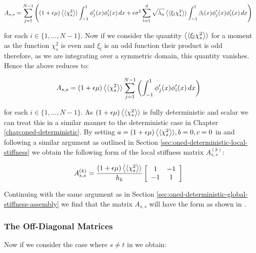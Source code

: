 \begin{equation}
    A_{s,s} = \sum_{j=1}^{N-1}\left((1 + \epsilon\mu)\left\langle\langle\chi_s^2\right\rangle\rangle
        \int_{-1}^1 \phi_j'(x)\phi_i'(x)\, dx
       + \epsilon\sigma^2\sum_{l=1}^d\sqrt{\lambda_n}\left\langle\langle\xi_l\chi_s^2\right\rangle\rangle
       \int_{-1}^1 \beta_l(x)\phi_j'(x)\phi_i'(x) \, dx\right)
\end{equation}

for each $i \in \{1,\ldots,N-1\}$. Now if we consider the quantity
$\left\langle\langle\xi_l\chi_s^2\right\rangle\rangle$ for a moment as the function $\chi_s^2$ is even and
$\xi_l$ is an odd function their product is odd therefore, as we are integrating
over a symmetric domain, this quantity vanishes. Hence the above reduces to:

\begin{equation}
    A_{s,s} = (1 + \epsilon\mu)\left\langle\langle\chi_s^2\right\rangle\rangle\sum_{j=1}^{N - 1}\left(\int_{-1}^1
                \phi_j'(x)\phi_i'(x)\, dx\right)
\end{equation}

for each $i \in \{1,\ldots,N-1\}$. As $(1 + \epsilon\mu)\left\langle\langle\chi_s^2\right\rangle\rangle$ is
fully deterministic and scalar we can treat this in a similar manner to the
deterministic case in  Chapter \ref{chap:oned-deterministic}. By setting $a =
(1 +\epsilon\mu)\left\langle\langle\chi_s^2\right\rangle\rangle, b = 0, c = 0$ in
 and following a similar argument as
outlined in Section \ref{sec:oned-deterministic-local-stiffness} we obtain the
following form of the local stiffness matrix $A_{s,s}^{(k)}$:

\begin{equation}\label{eq:oned-stochasic-local-stifness-diag}
    A_{s,s}^{(k)} = \frac{(1 + \epsilon\mu)\left\langle\langle\chi_s^2\right\rangle\rangle}{h_k}
              \left[\begin{array}{c c}
                1 & -1 \\ -1 & 1
              \end{array}\right]
\end{equation}

Continuing with the same argument as in Section
\ref{sec:oned-deterministic-global-stiffness-assembly} we find that the matrix
$A_{s,s}$ will have the form as shown in
.

\subsubsection{The Off-Diagonal Matrices}

Now if we consider the case where $s \neq t$ in
 we obtain:

